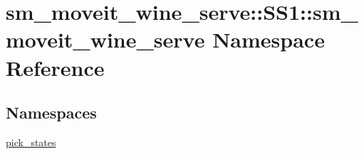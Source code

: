 \hypertarget{namespacesm__moveit__wine__serve_1_1SS1_1_1sm__moveit__wine__serve}{}\section{sm\+\_\+moveit\+\_\+wine\+\_\+serve\+:\+:S\+S1\+:\+:sm\+\_\+moveit\+\_\+wine\+\_\+serve Namespace Reference}
\label{namespacesm__moveit__wine__serve_1_1SS1_1_1sm__moveit__wine__serve}
\subsection*{Namespaces}
\begin{DoxyCompactItemize}
\item 
 \hyperlink{namespacesm__moveit__wine__serve_1_1SS1_1_1sm__moveit__wine__serve_1_1pick__states}{pick\+\_\+states}
\end{DoxyCompactItemize}
